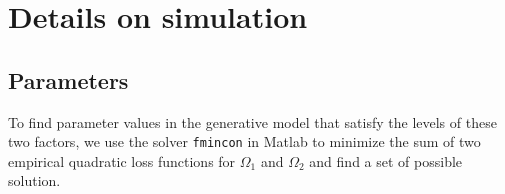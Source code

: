 %
\section{Details on simulation }
\subsection{Parameters}
	To find parameter values in the generative model that satisfy the levels of these two factors, we use the solver \texttt{fmincon} in Matlab to minimize the sum of two empirical quadratic loss functions for $\Omega_1$ and $\Omega_2$ and find a set of possible solution. \\
